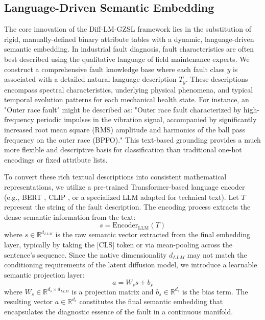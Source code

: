 \subsection{Language-Driven Semantic Embedding}
\label{sec:semantic}
The core innovation of the Diff-LM-GZSL framework lies in the substitution of rigid, manually-defined binary attribute tables with a dynamic, language-driven semantic embedding. In industrial fault diagnosis, fault characteristics are often best described using the qualitative language of field maintenance experts. We construct a comprehensive fault knowledge base where each fault class $y$ is associated with a detailed natural language description $T_y$. These descriptions encompass spectral characteristics, underlying physical phenomena, and typical temporal evolution patterns for each mechanical health state. For instance, an "Outer race fault" might be described as: "Outer race fault characterized by high-frequency periodic impulses in the vibration signal, accompanied by significantly increased root mean square (RMS) amplitude and harmonics of the ball pass frequency on the outer race (BPFO)." This text-based grounding provides a much more flexible and descriptive basis for classification than traditional one-hot encodings or fixed attribute lists.

To convert these rich textual descriptions into consistent mathematical representations, we utilize a pre-trained Transformer-based language encoder (e.g., BERT \cite{Devlin2019BERT}, CLIP \cite{Radford2021CLIP}, or a specialized LLM adapted for technical text). Let $T$ represent the string of the fault description. The encoding process extracts the dense semantic information from the text:
\begin{equation}
s = \text{Encoder}_{\text{LLM}}(T)
\end{equation}
where $s \in \mathbb{R}^{d_{LLM}}$ is the raw semantic vector extracted from the final embedding layer, typically by taking the [CLS] token or via mean-pooling across the sentence's sequence. Since the native dimensionality $d_{LLM}$ may not match the conditioning requirements of the latent diffusion model, we introduce a learnable semantic projection layer:
\begin{equation}
a = W_s s + b_s
\end{equation}
where $W_s \in \mathbb{R}^{d_s \times d_{LLM}}$ is a projection matrix and $b_s \in \mathbb{R}^{d_s}$ is the bias term. The resulting vector $a \in \mathbb{R}^{d_s}$ constitutes the final semantic embedding that encapsulates the diagnostic essence of the fault in a continuous manifold.

